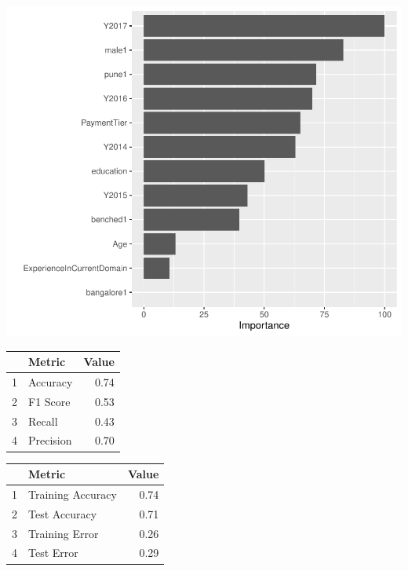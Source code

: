\documentclass[11pt,preprint, authoryear]{elsarticle}
\let\origtable\table
\let\endorigtable\endtable
\renewenvironment{table}[1][2] {
    \expandafter\origtable\expandafter[H]
} {
    \endorigtable
}
\numberwithin{equation}{section}
\numberwithin{figure}{section}
\numberwithin{table}{section}
\begin{document}
\includegraphics{Final_project_files/figure-latex/Table2-1.pdf}

\begin{table}[H]
\centering
\begin{tabular}{rlr}
  \hline
 & Metric & Value \\ 
  \hline
1 & Accuracy & 0.74 \\ 
  2 & F1 Score & 0.53 \\ 
  3 & Recall & 0.43 \\ 
  4 & Precision & 0.70 \\ 
   \hline
\end{tabular}
\caption{Metrics for Logistic Regression \label{tab1}} 
\end{table}

\begin{table}[H]
\centering
\begin{tabular}{rlr}
  \hline
 & Metric & Value \\ 
  \hline
1 & Training Accuracy & 0.74 \\ 
  2 & Test Accuracy & 0.71 \\ 
  3 & Training Error & 0.26 \\ 
  4 & Test Error & 0.29 \\ 
   \hline
\end{tabular}
\caption{More Metrics for Logistic Regression \label{tab1}} 
\end{table}
\end{document}
